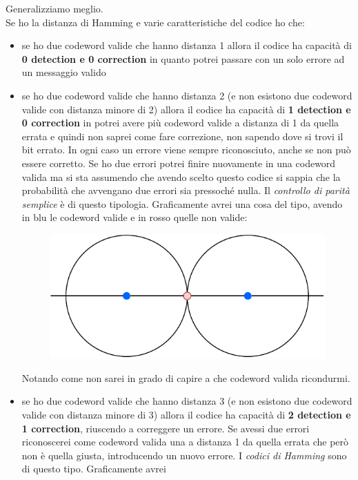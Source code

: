 \documentclass[a4paper,12pt, oneside]{book}
\begin{document}
Generalizziamo meglio.\\
Se ho la distanza di Hamming e varie caratteristiche del codice ho che:
\begin{itemize}
  \item se ho due codeword valide che hanno distanza 1 allora il codice ha
  capacità di \textbf{0 detection e 0 correction} in quanto potrei passare con
  un solo errore ad un messaggio valido
  \item se ho due codeword valide che hanno distanza 2 (e non esistono due
  codeword valide con distanza minore di 2) allora il codice ha
  capacità di \textbf{1 detection e 0 correction} in potrei avere più codeword
  valide a distanza di 1 da quella errata e quindi non saprei come fare
  correzione, non sapendo dove si trovi il bit errato. In ogni caso un errore
  viene sempre riconosciuto, anche se non può essere corretto. Se ho due errori
  potrei finire nuovamente in una codeword valida ma si sta assumendo che avendo
  scelto questo codice si sappia che la probabilità che avvengano due errori sia
  pressoché nulla. Il\textit{ controllo di parità semplice} è di questo
  tipologia.
  \newpage
  Graficamente avrei 
  una cosa del tipo, avendo in blu le codeword valide e in rosso quelle non
  valide: 
  \begin{figure}[H]
    \centering
    \includegraphics[scale = 0.8]{img/circ2.pdf}
  \end{figure}
  Notando come non sarei in grado di capire a che codeword valida ricondurmi.
  \item se ho due codeword valide che hanno distanza 3 (e non esistono due
  codeword valide con distanza minore di 3) allora il codice ha
  capacità di \textbf{2 detection e 1 correction}, riuscendo a correggere un
  errore. Se avessi due errori riconoscerei come codeword valida una a distanza
  1 da quella errata che però non è quella giusta, introducendo un nuovo
  errore. I \textit{codici di Hamming} sono di questo tipo. Graficamente avrei

\end{itemize}
\end{document}
